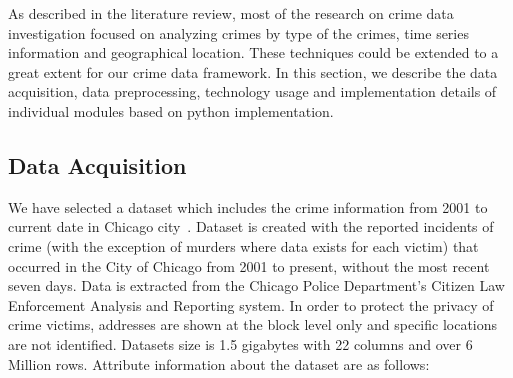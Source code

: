 As described in the literature review, most of the research on crime
data investigation focused on analyzing crimes by type of the crimes,
time series information and geographical location. These techniques
could be extended to a great extent for our crime data framework. In
this section, we describe the data acquisition, data preprocessing,
technology usage and implementation details of individual modules
based on python implementation. 

\subsection{Data Acquisition}\label{dataset}

We have selected a dataset which includes the crime information from
2001 to current date in Chicago
city~\cite{hid-sp18-409-www-data.gov}. Dataset is created with the
reported incidents of crime (with the exception of murders where data
exists for each victim) that occurred in the City of Chicago from 2001
to present, without the most recent seven days. Data is extracted from
the Chicago Police Department's Citizen Law Enforcement Analysis and
Reporting system. In order to protect the privacy of crime victims,
addresses are shown at the block level only and specific locations are
not identified. Datasets size is 1.5 gigabytes with 22 columns and
over 6 Million rows. Attribute information about the dataset are as
follows:

